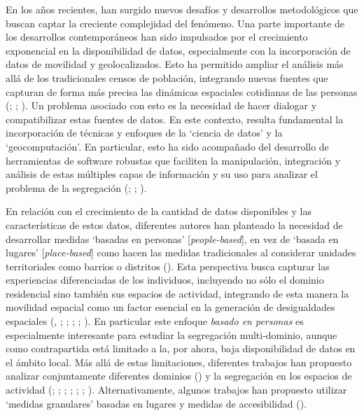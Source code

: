 \documentclass[
  spanish,
  a4paper,%
  chapterprefix=true,%
  DIV=calc,%
  twoside]{scrbook}%
\begin{document}
En los años recientes, han surgido nuevos desafíos y desarrollos
metodológicos que buscan captar la creciente complejidad del fenómeno.
Una parte importante de los desarrollos contemporáneos han sido
impulsados por el crecimiento exponencial en la disponibilidad de datos,
especialmente con la incorporación de datos de movilidad y
geolocalizados. Esto ha permitido ampliar el análisis más allá de los
tradicionales censos de población, integrando nuevas fuentes que
capturan de forma más precisa las dinámicas espaciales cotidianas de las
personas (; ; ). Un problema asociado con esto
es la necesidad de hacer dialogar y compatibilizar estas fuentes de
datos. En este contexto, resulta fundamental la incorporación de
técnicas y enfoques de la `ciencia de datos' y la `geocomputación'. En
particular, esto ha sido acompañado del desarrollo de herramientas de
software robustas que faciliten la manipulación, integración y análisis
de estas múltiples capas de información y su uso para analizar el
problema de la segregación (; ; ).

En relación con el crecimiento de la cantidad de datos disponibles y las
características de estos datos, diferentes autores han planteado la
necesidad de desarrollar medidas `basadas en personas' {[}\emph{people-based}{]},
en vez de `basada en lugares' {[}\emph{place-based}{]} como hacen las medidas
tradicionales al considerar unidades territoriales como barrios o
distritos (). Esta perspectiva busca capturar las experiencias
diferenciadas de los individuos, incluyendo no sólo el dominio
residencial sino también sus espacios de actividad, integrando de esta
manera la movilidad espacial como un factor esencial en la generación de
desigualdades espaciales (, ; ; ; ; ). En particular este enfoque \emph{basado
en personas} es especialmente interesante para estudiar la segregación
multi-dominio, aunque como contrapartida está limitado a la, por ahora,
baja disponibilidad de datos en el ámbito local. Más allá de estas
limitaciones, diferentes trabajos han propuesto analizar conjuntamente
diferentes dominios () y la segregación en los espacios de
actividad (; ; ; ; ; ; ). Alternativamente, algunos trabajos han
propuesto utilizar `medidas granulares' basadas en lugares y medidas de
accesibilidad ().
\end{document}
